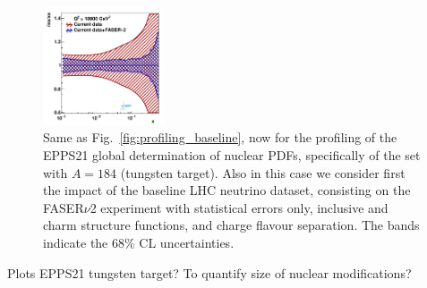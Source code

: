 \begin{figure}[t]
\includegraphics[width=0.32\textwidth]{plots/nuclear_fasernu2/statOnly_FASERv2_q2_10000_pdf_s_ratio.pdf}
\caption{Same as Fig.~\ref{fig:profiling_baseline},
now for the profiling of the EPPS21 global determination of nuclear PDFs,
specifically of the set with $A=184$ (tungsten target).
%
Also in this case we consider first the impact of the baseline LHC neutrino dataset, consisting
on the FASER$\nu$2 experiment
with statistical errors only, inclusive and charm structure functions,  and charge flavour
separation.
%
The bands indicate the 68\% CL uncertainties.
}
\label{fig:profiling_baseline_nuclear}
\end{figure}


Plots EPPS21 tungsten target? To quantify size of nuclear modifications?
